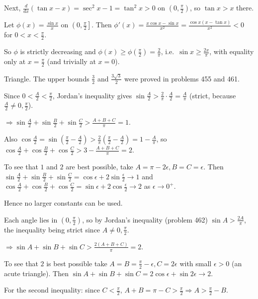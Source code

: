   Next, $\frac{d}{dx}(\tan x - x) = \sec^2x - 1 = \tan^2x > 0$ on $\left(0, \frac{\pi}{2}\right)$, so $\tan
  x > x$ there.

  Let $\phi(x) = \frac{\sin x}{x}$ on $\left(0, \frac{\pi}{2}\right]$. Then $\phi'(x) = \frac{x\cos x - \sin
    x}{x^2} = \frac{\cos x(x - \tan x)}{x^2} < 0$ for $0 < x < \frac{\pi}{2}$.

  So $\phi$ is strictly decreasing and $\phi(x)\geq\phi\left(\frac{\pi}{2}\right) = \frac{2}{\pi}$, i.e.\
  $\sin x\geq\frac{2x}{\pi}$, with equality only at $x = \frac{\pi}{2}$ (and trivially at $x = 0$).

  Triangle. The upper bounds $\frac{3}{2}$ and $\frac{3\sqrt{3}}{2}$ were proved in problems 455 and 461.

  Since $0 < \frac{A}{2} < \frac{\pi}{2}$, Jordan's inequality gives $\sin\frac{A}{2} > \frac{2}{\pi}\cdot\frac{A}{2}
  = \frac{A}{\pi}$ (strict, because $\frac{A}{2}\neq 0, \frac{\pi}{2}$).

  $\Rightarrow\sin\frac{A}{2} + \sin\frac{B}{2} + \sin\frac{C}{2} > \frac{A + B + C}{\pi} = 1$.

  Also $\cos\frac{A}{2} = \sin\left(\frac{\pi}{2} - \frac{A}{2}\right) > \frac{2}{\pi}\left(\frac{\pi}{2}
  - \frac{A}{2}\right) = 1 - \frac{A}{\pi}$, so $\cos\frac{A}{2} + \cos\frac{B}{2} + \cos\frac{C}{2} > 3 -
  \frac{A + B + C}{\pi} = 2$.

  To see that $1$ and $2$ are best possible, take $A = \pi - 2\epsilon, B = C = \epsilon$. Then
  $\sin\frac{A}{2} + \sin\frac{B}{2} + \sin\frac{C}{2} = \cos\epsilon + 2\sin\frac{\epsilon}{2}\to 1$ and
  $\cos\frac{A}{2} + \cos\frac{B}{2} + \cos\frac{C}{2} = \sin\epsilon + 2\cos\frac{\epsilon}{2}\to 2$ as
  $\epsilon\to 0^+$.

  Hence no larger constants can be used.
\item Each angle lies in $\left(0, \frac{\pi}{2}\right)$, so by Jordan's inequality (problem 462) $\sin A
  > \frac{2A}{\pi}$, the inequality being strict since $A\neq 0, \frac{\pi}{2}$.

  $\Rightarrow\sin A + \sin B + \sin C > \frac{2(A + B + C)}{\pi} = 2$.

  To see that $2$ is best possible take $A = B = \frac{\pi}{2} - \epsilon, C = 2\epsilon$ with small
  $\epsilon > 0$ (an acute triangle). Then $\sin A + \sin B + \sin C = 2\cos\epsilon + \sin2\epsilon\to 2$.

  For the second inequality: since $C < \frac{\pi}{2}$, $A + B = \pi - C > \frac{\pi}{2}\Rightarrow A
  > \frac{\pi}{2} - B$.

